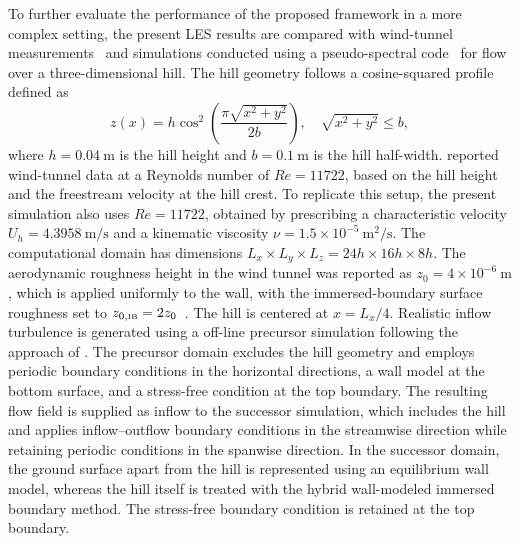 \documentclass[%
superscriptaddress,
 amsmath,amssymb,
pra,
showkeys,
]{revtex4-2}
\begin{document}
To further evaluate the performance of the proposed framework in a more complex setting, the present LES results are compared with wind-tunnel measurements~\cite{cao2006experimental} and simulations conducted using a pseudo-spectral code~\cite{liu2020wall} for flow over a three-dimensional hill. The hill geometry follows a cosine-squared profile defined as
\begin{equation}
    z(x) = h \cos^2\left(\frac{\pi \sqrt{x^2 + y^2}}{2b}\right), \quad \sqrt{x^2 + y^2} \leq b,
\end{equation}
where $h = 0.04~\mathrm{m}$ is the hill height and $b = 0.1~\mathrm{m}$ is the hill half-width. \citet{ishihara1999wind} reported wind-tunnel data at a Reynolds number of $Re = \num{11722}$, based on the hill height and the freestream velocity at the hill crest. To replicate this setup, the present simulation also uses $Re = \num{11722}$, obtained by prescribing a characteristic velocity $U_h = 4.3958~\mathrm{m/s}$ and a kinematic viscosity $\nu = 1.5 \times 10^{-5}~\mathrm{m^2/s}$. The computational domain has dimensions $L_x \times L_y \times L_z = 24h \times 16h \times 8h$. The aerodynamic roughness height in the wind tunnel was reported as $z_0 = 4 \times 10^{-6}~\mathrm{m}$, which is applied uniformly to the wall, with the immersed-boundary surface roughness set to $z_{0,\hbox{\tiny IB}} = 2 z_0$~\cite{fang2016intercomparison, liu2020wall}. The hill is centered at $x = L_x / 4$. Realistic inflow turbulence is generated using a off-line precursor simulation following the approach of \citet{stipa2024tosca}. The precursor domain excludes the hill geometry and employs periodic boundary conditions in the horizontal directions, a wall model at the bottom surface, and a stress-free condition at the top boundary. The resulting flow field is supplied as inflow to the successor simulation, which includes the hill and applies inflow--outflow boundary conditions in the streamwise direction while retaining periodic conditions in the spanwise direction. In the successor domain, the ground surface apart from the hill is represented using an equilibrium wall model, whereas the hill itself is treated with the hybrid wall-modeled immersed boundary method. The stress-free boundary condition is retained at the top boundary.
\end{document}
